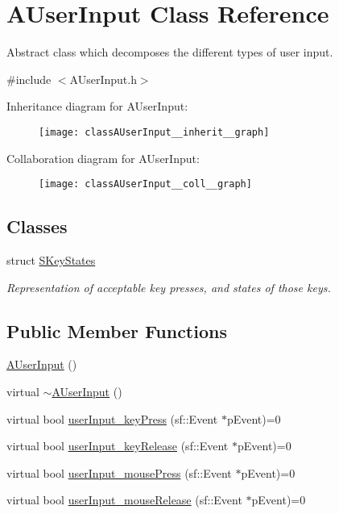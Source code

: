\hypertarget{classAUserInput}{\section{A\-User\-Input Class Reference}
\label{classAUserInput}
}


Abstract class which decomposes the different types of user input.  




{\ttfamily \#include $<$A\-User\-Input.\-h$>$}



Inheritance diagram for A\-User\-Input\-:\nopagebreak
\begin{figure}[H]
\begin{center}
\leavevmode
\texttt{[image: classAUserInput\_\_inherit\_\_graph]}
\end{center}
\end{figure}


Collaboration diagram for A\-User\-Input\-:\nopagebreak
\begin{figure}[H]
\begin{center}
\leavevmode
\texttt{[image: classAUserInput\_\_coll\_\_graph]}
\end{center}
\end{figure}
\subsection*{Classes}
\begin{DoxyCompactItemize}
\item 
struct \hyperlink{structAUserInput_1_1SKeyStates}{S\-Key\-States}
\begin{DoxyCompactList}\small\item\em Representation of acceptable key presses, and states of those keys. \end{DoxyCompactList}\end{DoxyCompactItemize}
\subsection*{Public Member Functions}
\begin{DoxyCompactItemize}
\item 
\hyperlink{classAUserInput_a83cdb578d5ff8c37f1fb219234d7319b}{A\-User\-Input} ()
\item 
virtual \hyperlink{classAUserInput_a8e45374f4f78942389badab10fa1ef04}{$\sim$\-A\-User\-Input} ()
\item 
virtual bool \hyperlink{classAUserInput_a110239bcc0461666583d1dc940cb5d13}{user\-Input\-\_\-key\-Press} (sf\-::\-Event $\ast$p\-Event)=0
\item 
virtual bool \hyperlink{classAUserInput_afe8ae22fff673d788e366b9b29ffa67d}{user\-Input\-\_\-key\-Release} (sf\-::\-Event $\ast$p\-Event)=0
\item 
virtual bool \hyperlink{classAUserInput_a567e0d0610bd2ef2e23fed64b3e56d2b}{user\-Input\-\_\-mouse\-Press} (sf\-::\-Event $\ast$p\-Event)=0
\item 
virtual bool \hyperlink{classAUserInput_a570f71dde4825c3e9bdcf6b58857f514}{user\-Input\-\_\-mouse\-Release} (sf\-::\-Event $\ast$p\-Event)=0
\end{DoxyCompactItemize}
